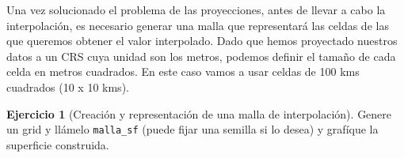 \documentclass[
]{report}
\newenvironment{Shaded}{\begin{snugshade}}{\end{snugshade}}
\newcommand{\AttributeTok}[1]{\textcolor[rgb]{0.77,0.63,0.00}{#1}}
\newcommand{\CommentTok}[1]{\textcolor[rgb]{0.56,0.35,0.01}{\textit{#1}}}
\newcommand{\DecValTok}[1]{\textcolor[rgb]{0.00,0.00,0.81}{#1}}
\newcommand{\FunctionTok}[1]{\textcolor[rgb]{0.00,0.00,0.00}{#1}}
\newcommand{\NormalTok}[1]{#1}
\newcommand{\OtherTok}[1]{\textcolor[rgb]{0.56,0.35,0.01}{#1}}
\newcommand{\SpecialCharTok}[1]{\textcolor[rgb]{0.00,0.00,0.00}{#1}}
\newcommand{\StringTok}[1]{\textcolor[rgb]{0.31,0.60,0.02}{#1}}
\theoremstyle{definition}
\theoremstyle{definition}
\theoremstyle{definition}
\newtheorem{exercise}{Ejercicio}[chapter]
\theoremstyle{definition}
\theoremstyle{remark}
\begin{document}
\begin{Shaded}
\end{Shaded}

Una vez solucionado el problema de las proyecciones, antes de llevar a cabo la
interpolación, es necesario generar una malla que representará las celdas de las
que queremos obtener el valor interpolado. Dado que hemos proyectado nuestros
datos a un CRS cuya unidad son los metros, podemos definir el tamaño de cada
celda en metros cuadrados. En este caso vamos a usar celdas de 100 kms cuadrados
(10 x 10 kms).

\begin{exercise}[Creación y representación de una malla de interpolación]
\protect\hypertarget{exr:ex12}{}\label{exr:ex12}Genere un grid y llámelo \texttt{malla\_sf} (puede fijar una semilla si lo desea) y
grafíque la superficie construida.
\end{exercise}
\end{document}
